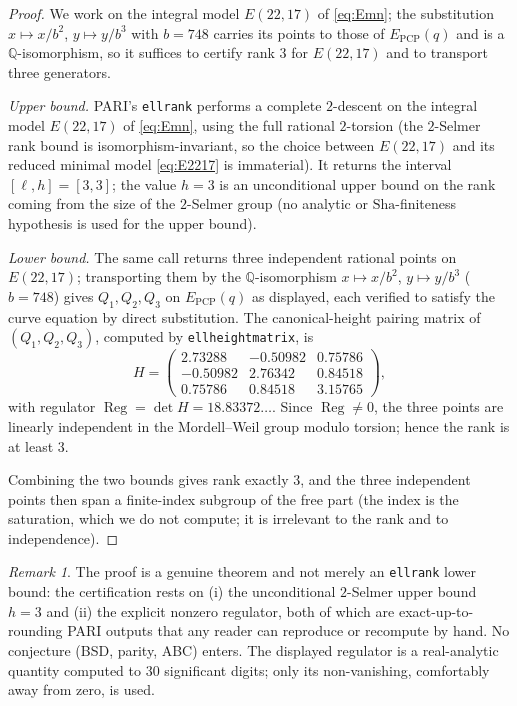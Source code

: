 \documentclass[11pt,reqno]{amsart}
\theoremstyle{plain}
\theoremstyle{definition}
\theoremstyle{remark}
\newtheorem{remark}[theorem]{Remark}
\newcommand{\Q}{\mathbb{Q}}
\newcommand{\PCP}{E_{\mathrm{PCP}}}
\DeclareMathOperator{\Reg}{Reg}
\begin{document}
\begin{proof}
We work on the integral model $E(22,17)$ of \eqref{eq:Emn}; the substitution
$x\mapsto x/b^2$, $y\mapsto y/b^3$ with $b=748$ carries its points to those of
$\PCP(q)$ and is a $\Q$-isomorphism, so it suffices to certify rank $3$ for
$E(22,17)$ and to transport three generators.

\emph{Upper bound.} PARI's \texttt{ellrank} performs a complete $2$-descent on
the integral model $E(22,17)$ of \eqref{eq:Emn}, using the full rational
$2$-torsion (the $2$-Selmer rank bound is isomorphism-invariant, so the choice
between $E(22,17)$ and its reduced minimal model \eqref{eq:E2217} is immaterial).
It returns the interval $[\ell,h]=[3,3]$; the value $h=3$ is an unconditional
upper bound on the rank coming from the size of the $2$-Selmer group (no analytic
or $\mathrm{Sha}$-finiteness hypothesis is used for the upper bound).

\emph{Lower bound.} The same call returns three independent rational points on
$E(22,17)$; transporting them by the $\Q$-isomorphism $x\mapsto x/b^2$,
$y\mapsto y/b^3$ ($b=748$) gives $Q_1,Q_2,Q_3$ on $\PCP(q)$ as displayed, each
verified to satisfy the curve equation by direct substitution. The
canonical-height pairing matrix of $(Q_1,Q_2,Q_3)$, computed by
\texttt{ellheightmatrix}, is
\[
H = \begin{pmatrix}
2.73288 & -0.50982 & 0.75786 \\
-0.50982 & 2.76342 & 0.84518 \\
0.75786 & 0.84518 & 3.15765
\end{pmatrix},
\]
with regulator $\Reg = \det H = 18.83372\ldots$. Since $\Reg\neq 0$, the three
points are linearly independent in the Mordell--Weil group modulo torsion;
hence the rank is at least $3$.

Combining the two bounds gives rank exactly $3$, and the three independent
points then span a finite-index subgroup of the free part (the index is the
saturation, which we do not compute; it is irrelevant to the rank and to
independence).
\end{proof}

\begin{remark}
The proof is a genuine theorem and not merely an \texttt{ellrank} lower bound:
the certification rests on (i) the unconditional $2$-Selmer upper bound $h=3$
and (ii) the explicit nonzero regulator, both of which are exact-up-to-rounding
PARI outputs that any reader can reproduce or recompute by hand. No conjecture
(BSD, parity, ABC) enters. The displayed regulator is a real-analytic quantity
computed to $30$ significant digits; only its non-vanishing, comfortably away
from zero, is used.
\end{remark}
\end{document}
